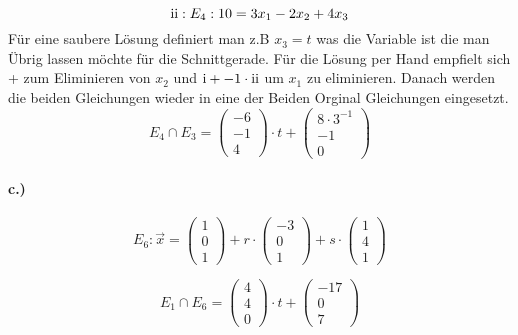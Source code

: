 \documentclass{article}
\newcommand{\RN}[1]{%
  	\textup{\uppercase\expandafter{\romannumeral#1}}%
	}
\begin{document}
\begin{equation}
	\RN{2} : E_4 : 10 = 3x_1 - 2x_2 + 4x_3
\end{equation}
Für eine saubere Lösung definiert man z.B \(x_3 = t\) was die Variable ist die man Übrig lassen möchte für die Schnittgerade. Für die Lösung per Hand empfielt sich \RN{1} + \RN{2} zum Eliminieren von \(x_2\) und \( \RN{1} + -1 \cdot \RN{2} \) um \(x_1\) zu eliminieren. Danach werden die beiden Gleichungen wieder in eine der Beiden Orginal Gleichungen eingesetzt.
\begin{equation}
	E_4 \cap E_3 = \begin{pmatrix}-6\\-1\\4\end{pmatrix} \cdot t + \begin{pmatrix}8 \cdot 3^{-1}\\-1\\0\end{pmatrix}
\end{equation}

\paragraph*{c.)}

\begin{equation}
	E_6 : \overrightarrow{x} = \begin{pmatrix}1\\0\\1\end{pmatrix} + r \cdot \begin{pmatrix}-3\\0\\1\end{pmatrix} + s \cdot \begin{pmatrix}1\\4\\1\end{pmatrix}
\end{equation}

\begin{equation}
	E_1 \cap E_6 = \begin{pmatrix}4\\4\\0\end{pmatrix} \cdot t + \begin{pmatrix}-17\\0\\7\end{pmatrix}
\end{equation}
\end{document}
